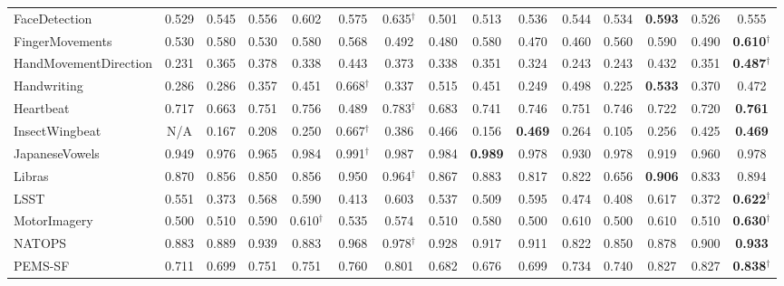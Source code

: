 \documentclass{article}
\begin{document}
\begin{table*}[t]
{\begin{tabular}{lcccccc|cccccccc}
FaceDetection  & 0.529	  & 0.545	    	 & 0.556	& 0.602	        & 0.575	       & 0.635$^\dag$  & 0.501	               & 0.513	        & 0.536	       & 0.544	          & 0.534	& \textbf{0.593}  & 0.526    & 0.555        \\
FingerMovements  & 0.530	  & 0.580	    	 & 0.530	    & 0.580	        & 0.568	       & 0.492         & 0.480	               & 0.580	        & 0.470	       & 0.460	          & 0.560	 & 0.590  & 0.490    & \textbf{0.610}$^\dag$  \\
HandMovementDirection  & 0.231	  & 0.365	   	 & 0.378	& 0.338	        & 0.443 & 0.373         & 0.338	               & 0.351	        & 0.324	     & 0.243	          & 0.243    &    0.432   &  0.351 &
 \textbf{0.487}$^\dag$\\
Handwriting  & 0.286	  & 0.286	    	 & 0.357	& 0.451	        & 0.668$^\dag$  & 0.337         & 0.515	               & 0.451	        & 0.249	       & 0.498	          & 0.225	& \textbf{0.533}   & 0.370     & 0.472    \\
Heartbeat  & 0.717	  & 0.663	    	 & 0.751	& 0.756	        & 0.489	       & 0.783$^\dag$  & 0.683	               & 0.741	        & 0.746	       & 0.751	  & 0.746	& 0.722      &  0.720 &   \textbf{0.761} \\

InsectWingbeat  & N/A	      & 0.167	   	 & 0.208	& 0.250	        & 0.667$^\dag$ & 0.386         & 0.466                 & 0.156	        &\textbf{0.469} & 0.264	          & 0.105	 & 0.256      & 0.425    & \textbf{0.469}       \\  

JapaneseVowels  & 0.949	  & 0.976	    	 & 0.965	& 0.984	        & 0.991$^\dag$ & 0.987         & 0.984	               & \textbf{0.989} & 0.978	       & 0.930	          & 0.978 & 0.919	 &  0.960  & 0.978     \\
Libras & 0.870	  & 0.856	   	 & 0.850	    & 0.856	        & 0.950	       & 0.964$^\dag$  & 0.867	               & 0.883	        & 0.817	       & 0.822	          & 0.656	& \textbf{0.906} & 0.833    & 0.894   \\
LSST  & 0.551	  & 0.373	    	 & 0.568    & 0.590	        & 0.413	       & 0.603         & 0.537	               & 0.509	        & 0.595	       & 0.474	          & 0.408	& 0.617    & 0.372     & \textbf{0.622}$^\dag$    \\
MotorImagery & 0.500	  & 0.510	    	 & 0.590	    &0.610$^\dag$    & 0.535	       & 0.574         & 0.510	               & 0.580	        & 0.500	       & 0.610  & 0.500	  &  0.610 & 0.510   & \textbf{0.630}$^\dag$  \\
NATOPS  & 0.883	  & 0.889	    	 & 0.939	& 0.883	        & 0.968	       & 0.978$^\dag$        & 0.928        & 0.917          & 0.911	       & 0.822	          & 0.850	& 0.878     & 0.900     & \textbf{0.933}         \\
PEMS-SF  & 0.711	  & 0.699	   	 & 0.751	& 0.751	        & 0.760	       & 0.801         & 0.682	               & 0.676	        & 0.699	       & 0.734	          & 0.740	& 0.827      & 0.827      & \textbf{0.838}$^\dag$ \\


\end{tabular}}
\end{table*}
\end{document}
